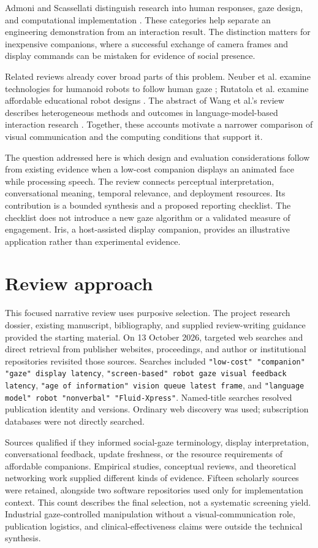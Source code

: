 \documentclass[journal]{IEEEtran}
\begin{document}
Admoni and Scassellati distinguish research into human responses, gaze design, and computational implementation \cite{admoni2017}. These categories help separate an engineering demonstration from an interaction result. The distinction matters for inexpensive companions, where a successful exchange of camera frames and display commands can be mistaken for evidence of social presence.

Related reviews already cover broad parts of this problem. Neuber et al. examine technologies for humanoid robots to follow human gaze \cite{neuber2026}; Rutatola et al. examine affordable educational robot designs \cite{rutatola2026}. The abstract of Wang et al.'s review describes heterogeneous methods and outcomes in language-model-based interaction research \cite{wang2026}. Together, these accounts motivate a narrower comparison of visual communication and the computing conditions that support it.

The question addressed here is which design and evaluation considerations follow from existing evidence when a low-cost companion displays an animated face while processing speech. The review connects perceptual interpretation, conversational meaning, temporal relevance, and deployment resources. Its contribution is a bounded synthesis and a proposed reporting checklist. The checklist does not introduce a new gaze algorithm or a validated measure of engagement. Iris, a host-assisted display companion, provides an illustrative application rather than experimental evidence.

\section{Review approach}
This focused narrative review uses purposive selection. The project research dossier, existing manuscript, bibliography, and supplied review-writing guidance provided the starting material. On 13 October 2026, targeted web searches and direct retrieval from publisher websites, proceedings, and author or institutional repositories revisited those sources. Searches included \texttt{"low-cost" "companion" "gaze" display latency}, \texttt{"screen-based" robot gaze visual feedback latency}, \texttt{"age of information" vision queue latest frame}, and \texttt{"language model" robot "nonverbal" "Fluid-Xpress"}. Named-title searches resolved publication identity and versions. Ordinary web discovery was used; subscription databases were not directly searched.

Sources qualified if they informed social-gaze terminology, display interpretation, conversational feedback, update freshness, or the resource requirements of affordable companions. Empirical studies, conceptual reviews, and theoretical networking work supplied different kinds of evidence. Fifteen scholarly sources were retained, alongside two software repositories used only for implementation context. This count describes the final selection, not a systematic screening yield. Industrial gaze-controlled manipulation without a visual-communication role, publication logistics, and clinical-effectiveness claims were outside the technical synthesis.
\end{document}
